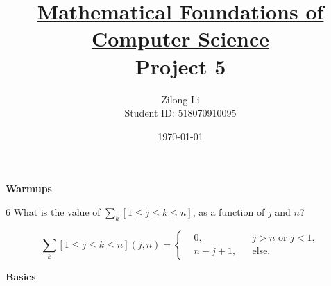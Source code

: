 \documentclass[a4paper,12pt]{article}
\title{\small \underline{Mathematical Foundations of Computer Science}\\\Large Project 5}
\author{Zilong Li\\\small Student ID: 518070910095}
\date{\today}
\makeatletter
\newtheorem*{solution}{Solution}
\theoremstyle{definition}
\renewenvironment{solution}[1][Solution] {\par\pushQED{\qed}\normalfont\topsep6\p@\@plus6\p@\relax\trivlist\item[\hskip\labelsep\bfseries#1\@addpunct{.}]\ignorespaces}{\popQED\endtrivlist\@endpefalse} \makeatother
\newenvironment{problems}{\begin{list}{}{\renewcommand{\makelabel}[1]{\textbf{##1}\hfil}}}{\end{list}}
\makeatother
\begin{document}
\maketitle

\noindent\textbf{Warmups}

\begin{problems}

    \item[6] What is the value of $\sum_k [1\leq j \leq k \leq n]$, as a function of $j$ and $n$? 
    \begin{solution}
        \begin{equation*}
        \sum_k [1\leq j \leq k \leq n](j,n) = \left\{\begin{aligned}
            &0, &&j>n\text{ or }j<1,\\
            &n-j+1, &&\text{else.}
        \end{aligned}\right.
        \end{equation*}
    \end{solution}
    
\end{problems}

\noindent\textbf{Basics}
\end{document}
